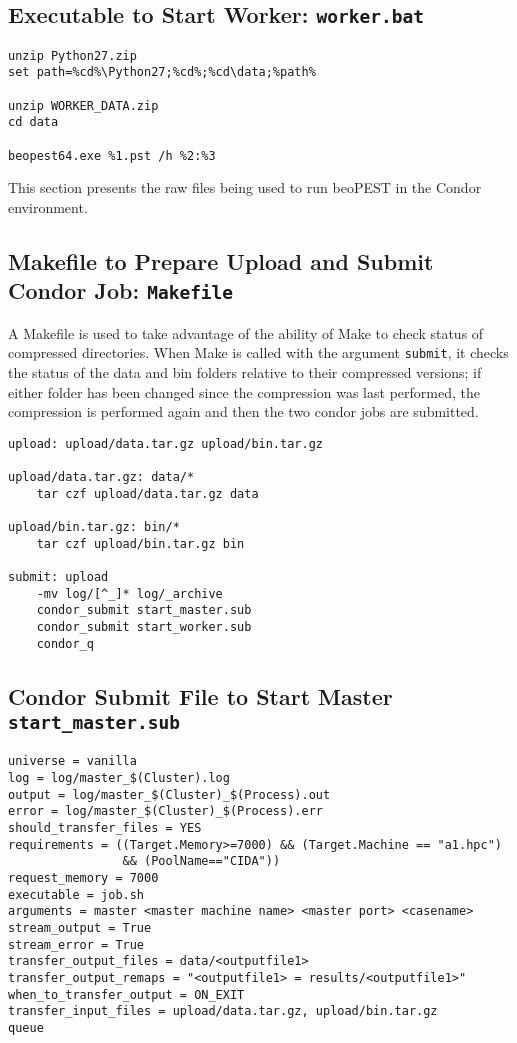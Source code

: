 \documentclass[11pt,twoside,onecolumn]{usgsreport}
\begin{document}
\subsection{Executable to Start Worker: \texttt{worker.bat}}
\begin{lstlisting}
unzip Python27.zip
set path=%cd%\Python27;%cd%;%cd\data;%path%

unzip WORKER_DATA.zip
cd data

beopest64.exe %1.pst /h %2:%3

\end{lstlisting}
\newpage
{}
This section presents the raw files being used to run beoPEST in the Condor environment.

\subsection{Makefile to Prepare Upload and Submit Condor Job: \texttt{Makefile}}
A Makefile is used to take advantage of the ability of Make to check status of compressed directories. When Make is called with the argument \texttt{submit}, it checks the status of the data and bin folders relative to their compressed versions; if either folder has been changed since the compression was last performed, the compression is performed again and then the two condor jobs are submitted.
\begin{lstlisting}
upload: upload/data.tar.gz upload/bin.tar.gz

upload/data.tar.gz: data/*
	tar czf upload/data.tar.gz data

upload/bin.tar.gz: bin/*
	tar czf upload/bin.tar.gz bin

submit: upload
	-mv log/[^_]* log/_archive
	condor_submit start_master.sub
	condor_submit start_worker.sub
	condor_q

\end{lstlisting}

\subsection{Condor Submit File to Start Master \texttt{start\_master.sub}}
\begin{lstlisting}
universe = vanilla
log = log/master_$(Cluster).log
output = log/master_$(Cluster)_$(Process).out
error = log/master_$(Cluster)_$(Process).err
should_transfer_files = YES
requirements = ((Target.Memory>=7000) && (Target.Machine == "a1.hpc")
                && (PoolName=="CIDA"))
request_memory = 7000
executable = job.sh
arguments = master <master machine name> <master port> <casename>
stream_output = True
stream_error = True
transfer_output_files = data/<outputfile1>
transfer_output_remaps = "<outputfile1> = results/<outputfile1>"
when_to_transfer_output = ON_EXIT
transfer_input_files = upload/data.tar.gz, upload/bin.tar.gz
queue 
\end{lstlisting}
\end{document}
